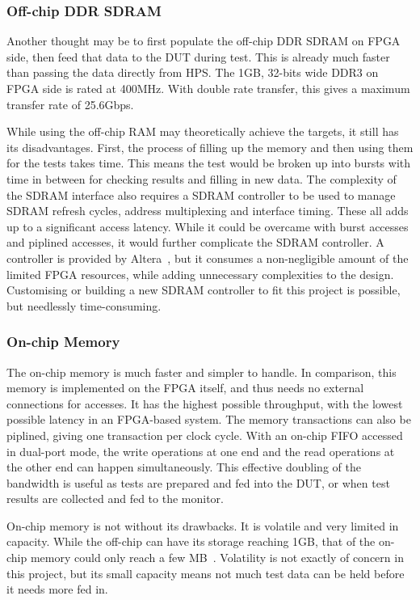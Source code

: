 \subsubsection{\textbf{Off-chip DDR SDRAM}}
Another thought may be to first populate the off-chip DDR SDRAM on FPGA
side, then feed that data to the DUT during test.
This is already much faster than passing the data directly from HPS.
The 1GB, 32-bits wide DDR3 on FPGA side is rated at 400MHz.
With double rate transfer, this gives a maximum transfer rate of 25.6Gbps.

While using the off-chip RAM may theoretically achieve the targets,
it still has its disadvantages.
First, the process of filling up the memory and then using them for the tests
takes time.
This means the test would be broken up into bursts with time in between for
checking results and filling in new data.
The complexity of the SDRAM interface also requires a SDRAM controller to be
used to manage SDRAM refresh cycles, address multiplexing and interface timing.
These all adds up to a significant access latency.
While it could be overcame with burst accesses and piplined accesses,
it would further complicate the SDRAM controller.
A controller is provided by Altera~\cite{Altera3}, but it consumes
a non-negligible amount of the limited FPGA resources, while adding
unnecessary complexities to the design.
Customising or building a new SDRAM controller to fit this project is possible,
but needlessly time-consuming.

\subsubsection{\textbf{On-chip Memory}}
The on-chip memory is much faster and simpler to handle.
In comparison, this memory is implemented on the FPGA itself, and thus needs
no external connections for accesses.
It has the highest possible throughput, with the lowest possible latency
in an FPGA-based system.
The memory transactions can also be piplined, giving one transaction per
clock cycle.
With an on-chip FIFO accessed in dual-port mode, the write operations at one
end and the read operations at the other end can happen simultaneously.
This effective doubling of the bandwidth is useful as tests are prepared
and fed into the DUT, or when test results are collected and fed to the
monitor.

On-chip memory is not without its drawbacks.
It is volatile and very limited in capacity.
While the off-chip can have its storage reaching 1GB, that of the on-chip
memory could only reach a few MB~\cite{Altera2}.
Volatility is not exactly of concern in this project, but its small capacity
means not much test data can be held before it needs more fed in.

